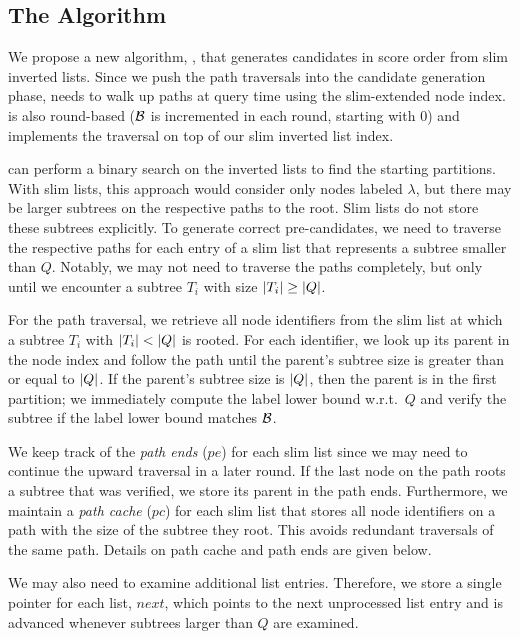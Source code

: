 \subsection{The \shincone{} Algorithm}
\label{subsec:a-memory-efficient-approach-the-shincone-algorithm}

We propose a new algorithm, \shincone{}, that generates candidates in score order from slim inverted lists. Since we push the path traversals into the candidate generation phase, \shincone{} needs to walk up paths at query time using the slim-extended node index. \shincone{} is also round-based ($\mathcal{B}$ is incremented in each round, starting with $0$) and implements the \cone{} traversal on top of our slim inverted list index.

\cone{} can perform a binary search on the inverted lists to find the starting partitions. With slim lists, this approach would consider only nodes labeled $\lambda$, but there may be larger subtrees on the respective paths to the root. Slim lists do not store these subtrees explicitly. To generate correct pre-candidates, we need to traverse the respective paths for each entry of a slim list that represents a subtree smaller than $Q$. Notably, we may not need to traverse the paths completely, but only until we encounter a subtree $T_i$ with size $\left| T_i \right| \geq \left| Q \right|$.

For the path traversal, we retrieve all node identifiers from the slim list at which a subtree $T_i$ with $\left| T_i \right| < \left| Q \right|$ is rooted. For each identifier, we look up its parent in the node index and follow the path until the parent's subtree size is greater than or equal to $\left| Q \right|$. If the parent's subtree size is $\left| Q \right|$, then the parent is in the first partition; we immediately compute the label lower bound w.r.t.\ $Q$ and verify the subtree if the label lower bound matches $\mathcal{B}$.

We keep track of the \emph{path ends} ($pe$) for each slim list since we may need to continue the upward traversal in a later round. If the last node on the path roots a subtree that was verified, we store its parent in the path ends.
Furthermore, we maintain a \emph{path cache} ($pc$) for each slim list that stores all node identifiers on a path with the size of the subtree they root. This avoids redundant traversals of the same path. Details on path cache and path ends are given below.

We may also need to examine additional list entries. Therefore, we store a single pointer for each list, $\mathit{next}$, which points to the next unprocessed list entry and is advanced whenever subtrees larger than $Q$ are examined.

